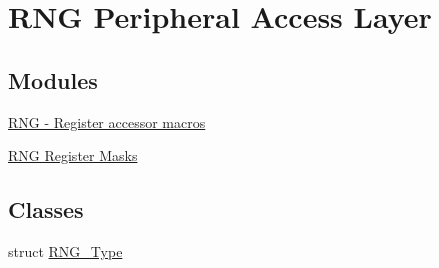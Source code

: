 \hypertarget{group__RNG__Peripheral__Access__Layer}{}\section{R\+NG Peripheral Access Layer}
\label{group__RNG__Peripheral__Access__Layer}
\subsection*{Modules}
\begin{DoxyCompactItemize}
\item 
\hyperlink{group__RNG__Register__Accessor__Macros}{R\+N\+G -\/ Register accessor macros}
\item 
\hyperlink{group__RNG__Register__Masks}{R\+N\+G Register Masks}
\end{DoxyCompactItemize}
\subsection*{Classes}
\begin{DoxyCompactItemize}
\item 
struct \hyperlink{structRNG__Type}{R\+N\+G\+\_\+\+Type}
\end{DoxyCompactItemize}
